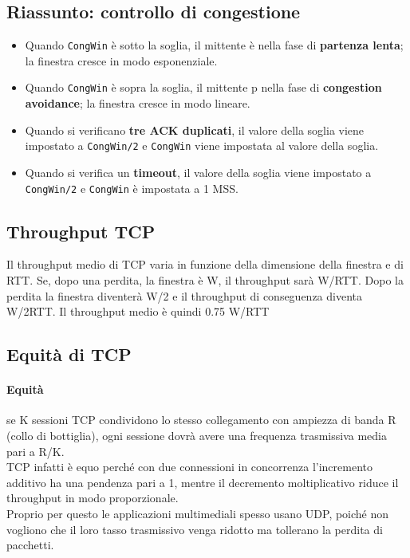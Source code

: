 \documentclass{report}
\begin{document}
	\subsection{Riassunto: controllo di congestione}
	\begin{itemize}
		\item Quando \verb|CongWin| è sotto la soglia, il mittente è nella fase di \textbf{partenza lenta}; la finestra cresce in modo esponenziale.
		\item Quando \verb|CongWin| è sopra la soglia, il mittente p nella fase di \textbf{congestion avoidance}; la finestra cresce in modo lineare.
		\item Quando si verificano \textbf{tre ACK duplicati}, il valore della soglia viene impostato a \verb|CongWin/2| e \verb|CongWin| viene impostata al valore della soglia.
		\item Quando si verifica un \textbf{timeout}, il valore della soglia viene impostato a \verb|CongWin/2| e \verb|CongWin| è impostata a 1 MSS.
	\end{itemize}
	\subsection{Throughput TCP}
	Il throughput medio di TCP varia in funzione della dimensione della finestra e di RTT. Se, dopo una perdita, la finestra è W, il throughput sarà W/RTT. Dopo la perdita la finestra diventerà W/2 e il throughput di conseguenza diventa W/2RTT. Il throughput medio è quindi 0.75 W/RTT
	\subsection{Equità di TCP}
	\paragraph{Equità} se K sessioni TCP condividono lo stesso collegamento con ampiezza di banda R (collo di bottiglia), ogni sessione dovrà avere una frequenza trasmissiva media pari a R/K.
	\medskip\\TCP infatti è equo perché con due connessioni in concorrenza l'incremento additivo ha una pendenza pari a 1, mentre il decremento moltiplicativo riduce il throughput in modo proporzionale.
	\medskip\\Proprio per questo le applicazioni multimediali spesso usano UDP, poiché non vogliono che il loro tasso trasmissivo venga ridotto ma tollerano la perdita di pacchetti.
	
\end{document}
